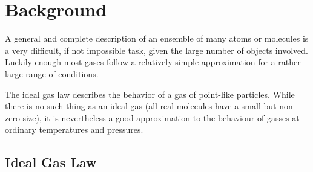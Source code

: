 
\label{lab:H7_1145L}

\section{Background}

A general and complete description of an ensemble of many atoms or molecules is a very difficult, if not impossible task, given the large number of objects involved. Luckily enough most gases follow a relatively simple approximation for a rather large range of conditions.

The ideal gas law describes the behavior of a gas of point-like
particles.  While there is no such thing as an ideal gas (all real
molecules have a small but non-zero size), it is nevertheless a good
approximation to the behaviour of gasses at ordinary temperatures and
pressures.

\subsection{Ideal Gas Law}

